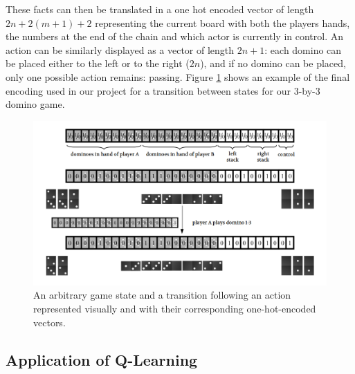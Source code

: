 \documentclass[12pt,a4paper]{article}
\begin{document}
These facts can then be translated in a one hot encoded vector of length $2n+2(m+1)+2$ representing the current board with both the players hands, the numbers at the end of the chain and which actor is currently in control. An action can be similarly displayed as a vector of length $2n+1$: each domino can be placed either to the left or to the right ($2n$), and if no domino can be placed, only one possible action remains: passing. 
Figure \ref{fig:encoding} shows an example of the final encoding used in our project for a transition between states for our 3-by-3 domino game.

\begin{figure}
  \includegraphics[width=\linewidth]{img/encoding.png}
  \caption{An arbitrary game state and a transition following an action represented visually and with their corresponding one-hot-encoded vectors.}
  \label{fig:encoding}
\end{figure}

\subsection{Application of Q-Learning}
\end{document}
